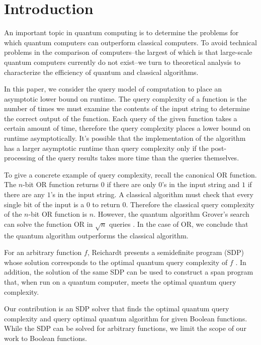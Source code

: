 \section{Introduction}

An important topic in quantum computing is
to determine the problems for which quantum
computers can outperform classical computers.
To avoid technical problems in the comparison of 
computers--the largest
of which is that large-scale quantum computers
currently do not exist--we turn to theoretical
analysis to characterize the efficiency of 
quantum and classical algorithms.

In this paper, we consider the query model of computation
to place an asymptotic lower bound on runtime.
The query complexity of a function 
is the number of times we must examine the
contents of the input string to determine the correct
output of the function. 
Each query of the given function takes a certain amount of time, therefore the query
complexity places a lower bound on runtime asymptotically. It's possible that the
implementation of the algorithm has a larger asymptotic runtime than query
complexity only if the post-processing of the query results takes more time than the
queries themselves.

To give a concrete example of query complexity,
recall the canonical OR function.
The $n$-bit OR
function returns $0$ if there are only $0$'s in the input
string and $1$ if there are any $1$'s in the input string.
A classical algorithm must check that
every single bit of the input is a $0$ to return $0$.
Therefore the classical query complexity of the $n$-bit OR
function is $n$. 
However, the quantum algorithm Grover's
search can solve the function OR in $\sqrt{n}$ queries
\cite{grover1996fast}. In the case of OR, we conclude that
the quantum algorithm outperforms the classical algorithm.

For an arbitrary function $f$,
Reichardt presents a semidefinite program (SDP)
whose solution corresponds to the optimal quantum query complexity
of $f$ \cite{reichardt2009span}.
In addition, the solution of the same SDP can
be used to construct a span program that, when run
on a quantum computer, meets the optimal quantum query complexity.

Our contribution is an SDP solver
that finds the optimal quantum query complexity
and query optimal quantum algorithm for given Boolean functions.
While the SDP can be solved for arbitrary functions,
we limit the scope of our work to Boolean functions.

